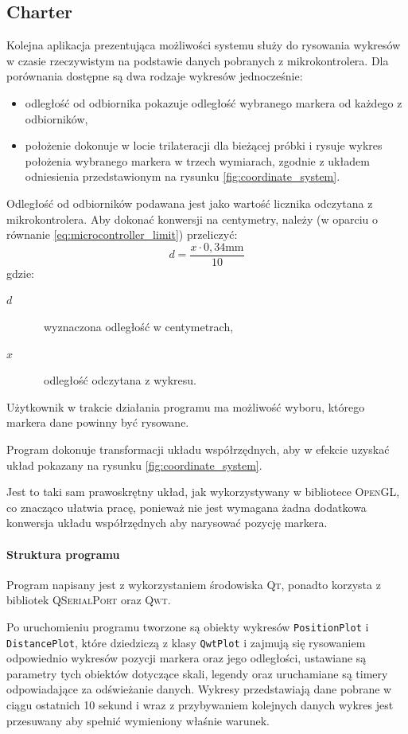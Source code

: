 \subsection{Charter}
Kolejna aplikacja prezentująca możliwości systemu służy do rysowania wykresów w czasie rzeczywistym na podstawie danych pobranych z mikrokontrolera. Dla porównania dostępne są dwa rodzaje wykresów jednocześnie:
\begin{itemize}
 \item odległość od odbiornika \ppauza pokazuje odległość wybranego markera od każdego z odbiorników,
 \item położenie \ppauza dokonuje w locie trilateracji dla bieżącej próbki i rysuje wykres położenia wybranego markera w trzech wymiarach, zgodnie z układem odniesienia przedstawionym na rysunku \ref{fig:coordinate_system}.
\end{itemize}

Odległość od odbiorników podawana jest jako wartość licznika odczytana z mikrokontrolera. Aby dokonać konwersji na centymetry, należy (w oparciu o równanie \ref{eq:microcontroller_limit}) przeliczyć:
\begin{equation}
 d = \frac{x \cdot 0,34\textrm{mm}}{10}
\end{equation}
gdzie:
\begin{description}
 \item[$d$] \ppauza~wyznaczona odległość w centymetrach,
 \item[$x$] \ppauza~odległość odczytana z wykresu.
\end{description}

Użytkownik w trakcie działania programu ma możliwość wyboru, którego markera dane powinny być rysowane.

Program dokonuje transformacji układu współrzędnych, aby w efekcie uzyskać układ pokazany na rysunku \ref{fig:coordinate_system}.

Jest to taki sam prawoskrętny układ, jak wykorzystywany w bibliotece \textsc{OpenGL}, co znacząco ułatwia pracę, ponieważ nie jest wymagana żadna dodatkowa konwersja układu współrzędnych aby narysować pozycję markera.

\paragraph{Struktura programu}
Program napisany jest z wykorzystaniem środowiska \textsc{Qt}, ponadto korzysta z bibliotek \textsc{QSerialPort} oraz \textsc{Qwt}.

Po uruchomieniu programu tworzone są obiekty wykresów \verb|PositionPlot| i \verb|DistancePlot|, które dziedziczą z klasy \verb|QwtPlot| i zajmują się rysowaniem odpowiednio wykresów pozycji markera oraz jego odległości, ustawiane są parametry tych obiektów dotyczące skali, legendy oraz uruchamiane są timery odpowiadające za odświeżanie danych. Wykresy przedstawiają dane pobrane w ciągu ostatnich 10 sekund i wraz z przybywaniem kolejnych danych wykres jest przesuwany aby spełnić wymieniony właśnie warunek.


